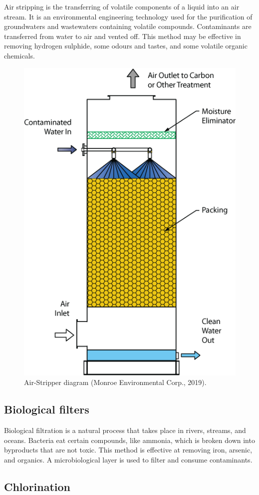 \documentclass[]{book}
\begin{document}
Air stripping is the transferring of volatile components of a liquid
into an air stream. It is an environmental engineering technology used
for the purification of groundwaters and wastewaters containing volatile
compounds. Contaminants are transferred from water to air and vented
off. This method may be effective in removing hydrogen sulphide, some
odours and tastes, and some volatile organic chemicals.

\begin{figure}

{\centering \includegraphics[width=0.35\linewidth]{figures/Air-Stripper} 

}

\caption{Air-Stripper diagram (Monroe Environmental Corp., 2019).}\label{fig:Air-Stripper}
\end{figure}

\subsection{Biological filters}\label{biological-filters}

Biological filtration is a natural process that takes place in rivers,
streams, and oceans. Bacteria eat certain compounds, like ammonia, which
is broken down into byproducts that are not toxic. This method is
effective at removing iron, arsenic, and organics. A microbiological
layer is used to filter and consume contaminants.

\subsection{Chlorination}\label{chlorination}
\end{document}
